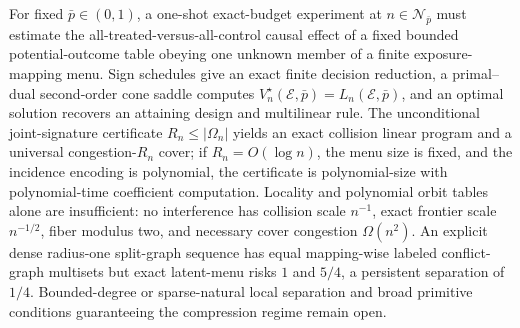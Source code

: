 For fixed \(\bar p\in(0,1)\), a one-shot exact-budget experiment at \(n\in\mathcal N_{\bar p}\) must estimate the all-treated-versus-all-control causal effect of a fixed bounded potential-outcome table obeying one unknown member of a finite exposure-mapping menu. Sign schedules give an exact finite decision reduction, a primal--dual second-order cone saddle computes \(V_n^\star(\mathcal E,\bar p)=L_n(\mathcal E,\bar p)\), and an optimal solution recovers an attaining design and multilinear rule. The unconditional joint-signature certificate \(R_n\le|\Omega_n|\) yields an exact collision linear program and a universal congestion-\(R_n\) cover; if \(R_n=O(\log n)\), the menu size is fixed, and the incidence encoding is polynomial, the certificate is polynomial-size with polynomial-time coefficient computation. Locality and polynomial orbit tables alone are insufficient: no interference has collision scale \(n^{-1}\), exact frontier scale \(n^{-1/2}\), fiber modulus two, and necessary cover congestion \(\Omega(n^2)\). An explicit dense radius-one split-graph sequence has equal mapping-wise labeled conflict-graph multisets but exact latent-menu risks \(1\) and \(5/4\), a persistent separation of \(1/4\). Bounded-degree or sparse-natural local separation and broad primitive conditions guaranteeing the compression regime remain open.